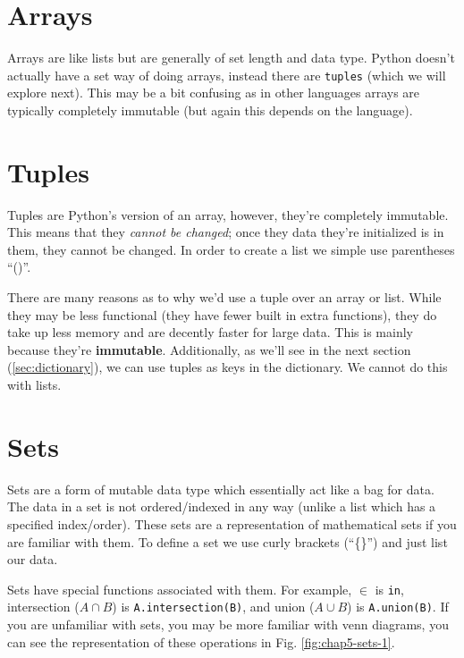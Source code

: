 \documentclass[12pt,a4paper]{book}
\newcommand{\figref}[1]{Fig. \ref{#1}}
\begin{document}
		\section{Arrays}
			Arrays are like lists but are generally of set length and data type. Python doesn't actually have a set way of doing arrays, instead there are \texttt{tuples} (which we will explore next). This may be a bit confusing as in other languages arrays are typically completely immutable (but again this depends on the language).
		
		\section{Tuples}
			Tuples are Python's version of an array, however, they're completely immutable. This means that they \textit{cannot be changed}; once they data they're initialized is in them, they cannot be changed. In order to create a list we simple use parentheses ``()''. 
			
			
			
			There are many reasons as to why we'd use a tuple over an array or list. While they may be less functional (they have fewer built in extra functions), they do take up less memory and are decently faster for large data. This is mainly because they're \textbf{immutable}. Additionally, as we'll see in the next section (\ref{sec:dictionary}), we can use tuples as keys in the dictionary. We cannot do this with lists.

		\section{Sets}
			Sets are a form of mutable data type which essentially act like a bag for data. The data in a set is not ordered/indexed in any way (unlike a list which has a specified index/order). These sets are a representation of mathematical sets if you are familiar with them. To define a set we use curly brackets (``\{\}'') and just list our data.
			

			Sets have special functions associated with them. For example, $\in$ is \texttt{in}, intersection ($A\cap B$) is \texttt{A.intersection(B)}, and union ($A\cup B$) is \texttt{A.union(B)}. If you are unfamiliar with sets, you may be more familiar with venn diagrams, you can see the representation of these operations in \figref{fig:chap5-sets-1}.
\end{document}
